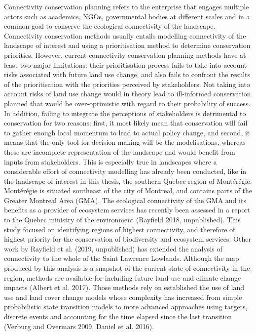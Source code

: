 Connectivity conservation planning refers to the enterprise that engages multiple actors such as academics, NGOs, governmental bodies at different scales and in a common goal to conserve the ecological connectivity of the landscape. Connectivity conservation methods usually entails modelling connectivity of the landscape of interest and using a prioritisation method to determine conservation priorities. However, current connectivity conservation planning methods have at least two major limitations: their prioritisation process fails to take into account risks associated with future land use change, and also fails to confront the results of the prioritisation with the priorities perceived by stakeholders. Not taking into account risks of land use change would in theory lead to ill-informed conservation planned that would be over-optimistic with regard to their probability of success. In addition, failing to integrate the perceptions of stakeholders is detrimental to conservation for two reasons: first, it most likely mean that conservation will fail to gather enough local momentum to lead to actual policy change, and second, it means that the only tool for decision making will be the modelisations, whereas these are incomplete representation of the landscape and would benefit from inputs from stakeholders. This is especially true in landscapes where a considerable effort of connectivity modelling has already been conducted, like in the landscape of interest in this thesis, the southern Quebec region of Montérégie.
Montérégie is situated southeast of the city of Montreal, and contains parts of the Greater Montreal Area (GMA). The ecological connectivity of the GMA and its benefits as a provider of ecosystem services has recently been assessed in a report to the Quebec ministry of the environment (Rayfield 2018, unpublished). This study focused on identifying regions of highest connectivity, and therefore of highest priority for the conservation of biodiversity and ecosystem services. Other work by Rayfield et al. (2019, unpublished) has extended the analysis of connectivity to the whole of the Saint Lawrence Lowlands.
Although the map produced by this analysis is a snapshot of the current state of connectivity in the region, methods are available for including future land use and climate change impacts (Albert et al. 2017). Those methods rely on established the use of land use and land cover change models whose complexity has increased from simple probabilistic state transition models to more advanced approaches using targets, discrete events and accounting for the time elapsed since the last transition  (Verburg and Overmars 2009, Daniel et al. 2016).
